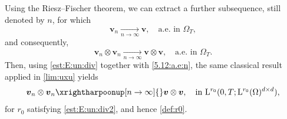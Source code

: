 \documentclass[12pt,reqno]{amsart}
\numberwithin{equation}{section}
\theoremstyle{definition}
\def\L{\mathrm{L}}
\def\vv{\boldsymbol{v}}
\begin{document}
{{\begin{equation}
\end{equation}
Using the Riesz--Fischer theorem, we can extract a further subsequence, still denoted by $n$, for which
\begin{equation*}
\vv_n \xrightarrow[n \to \infty]{} \vv, \quad \text{a.e. in } \Omega_T,
\end{equation*}
and consequently,
\begin{equation}\label{5.12:a.e:n}
\vv_n \otimes \vv_n \xrightarrow[n \to \infty]{} \vv \otimes \vv, \quad \text{a.e. in } \Omega_T.
\end{equation}
Then, using \eqref{est:E:un:div} together with \eqref{5.12:a.e:n}, the same classical result applied in \eqref{lim:uxu} yields
\begin{equation}\label{5.45}
{\vv_n \otimes \vv_n \xrightharpoonup[n\to\infty]{} \vv \otimes \vv, \quad  \text{in } \L^{r_0}(0,T;\L^{r_0}(\Omega)^{d\times d})},
\end{equation}
for $r_0$ satisfying \eqref{est:E:un:div2}, and hence \eqref{def:r0}.
}}
\end{document}
